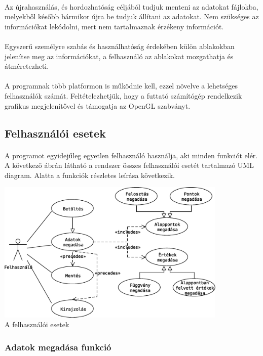 \documentclass[12pt]{report}
\begin{document}
\paragraph{}
Az újrahasználás, és hordozhatóság céljából tudjuk menteni az adatokat fájlokba, melyekből később bármikor újra be tudjuk állítani az adatokat. Nem szükséges az információkat lekódolni, mert nem tartalmaznak érzékeny információt.
\paragraph{}
Egyszerű személyre szabás és használhatóság érdekében külön ablakokban jelenítse meg az információkat, a felhasználó az ablakokat mozgathatja és átméretezheti.
\paragraph{}
A programnak több platformon is működnie kell, ezzel növelve a lehetséges felhasználók számát. Feltételezhetjük, hogy a futtató számítógép rendelkezik grafikus megjelenítővel és támogatja az OpenGL szabványt.
\subsection{Felhasználói esetek}
\paragraph{}
A programot egyidejűleg egyetlen felhasználó használja, aki minden funkciót elér. A következő ábrán látható a rendszer összes felhasználói esetét tartalmazó UML diagram. Alatta a funkciók részletes leírása következik.
\begin{center}
\includegraphics[width=11cm]{pics/uml/use_case}\\
{\footnotesize A felhasználói esetek}
\end{center}
\subsubsection{Adatok megadása funkció}
\end{document}
